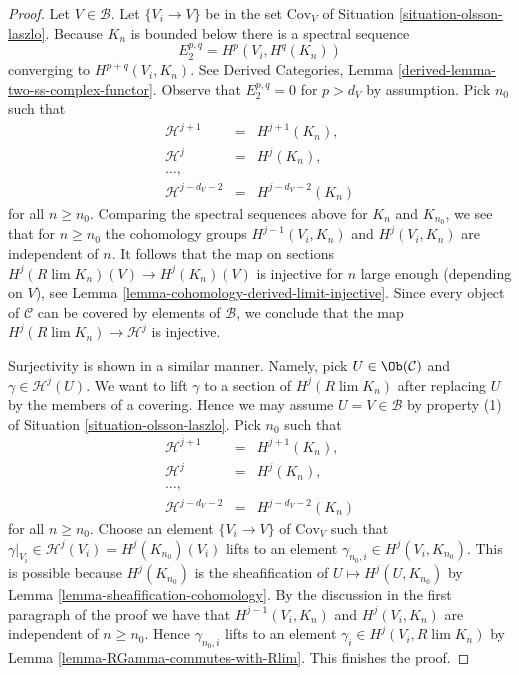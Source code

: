 \begin{proof}
Let $V \in \mathcal{B}$. Let $\{V_i \to V\}$ be in the set
$\text{Cov}_V$ of Situation \ref{situation-olsson-laszlo}.
Because $K_n$ is bounded below there is a spectral sequence
$$
E_2^{p, q} = H^p(V_i, H^q(K_n))
$$
converging to $H^{p + q}(V_i, K_n)$. See
Derived Categories, Lemma \ref{derived-lemma-two-ss-complex-functor}.
Observe that $E_2^{p, q} = 0$
for $p > d_V$ by assumption. Pick $n_0$ such that
$$
\begin{matrix}
\mathcal{H}^{j + 1} & = & H^{j + 1}(K_n), \\
\mathcal{H}^j & = & H^j(K_n), \\
\ldots, \\
\mathcal{H}^{j - d_V - 2} & = & H^{j - d_V - 2}(K_n)
\end{matrix}
$$
for all $n \geq n_0$. Comparing the spectral sequences above
for $K_n$ and $K_{n_0}$, we see that for $n \geq n_0$ the
cohomology groups $H^{j - 1}(V_i, K_n)$ and $H^j(V_i, K_n)$
are independent of $n$. It follows that the map on sections
$H^j(R\lim K_n)(V) \to H^j(K_n)(V)$ is injective for $n$ large
enough (depending on $V$), see
Lemma \ref{lemma-cohomology-derived-limit-injective}.
Since every object of $\mathcal{C}$ can be covered by elements
of $\mathcal{B}$, we conclude that the map
$H^j(R\lim K_n) \to \mathcal{H}^j$ is injective.

\medskip\noindent
Surjectivity is shown in a similar manner. Namely, pick
$U \in \Ob(\mathcal{C})$ and $\gamma \in \mathcal{H}^j(U)$.
We want to lift $\gamma$ to a section of $H^j(R\lim K_n)$
after replacing $U$ by the members of a covering. Hence we may
assume $U = V \in \mathcal{B}$ by property (1) of
Situation \ref{situation-olsson-laszlo}.
Pick $n_0$ such that
$$
\begin{matrix}
\mathcal{H}^{j + 1} & = & H^{j + 1}(K_n), \\
\mathcal{H}^j & = & H^j(K_n), \\
\ldots, \\
\mathcal{H}^{j - d_V - 2} & = & H^{j - d_V - 2}(K_n)
\end{matrix}
$$
for all $n \geq n_0$. Choose an element $\{V_i \to V\}$ of
$\text{Cov}_V$ such that
$\gamma|_{V_i} \in \mathcal{H}^j(V_i) = H^j(K_{n_0})(V_i)$
lifts to an element $\gamma_{n_0, i} \in H^j(V_i, K_{n_0})$.
This is possible because $H^j(K_{n_0})$ is the sheafification
of $U \mapsto H^j(U, K_{n_0})$ by Lemma \ref{lemma-sheafification-cohomology}.
By the discussion in the first paragraph of the proof we have that
$H^{j - 1}(V_i, K_n)$ and $H^j(V_i, K_n)$
are independent of $n \geq n_0$. Hence
$\gamma_{n_0, i}$ lifts to an element
$\gamma_i \in H^j(V_i, R\lim K_n)$ by
Lemma \ref{lemma-RGamma-commutes-with-Rlim}.
This finishes the proof.
\end{proof}

